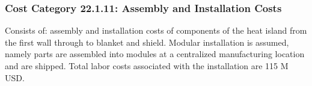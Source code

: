 \subsubsection*{Cost Category 22.1.11: Assembly and Installation Costs}
Consists of: assembly and installation costs of components of the heat island from the first wall through to blanket and shield.
Modular installation is assumed, namely parts are assembled into modules at a centralized manufacturing location and are shipped.
Total labor costs associated with the installation are 115 M USD.
